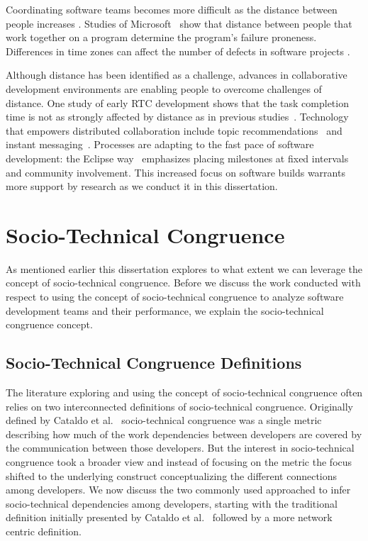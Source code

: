 Coordinating software teams becomes more difficult as the distance between people increases \cite{herbsleb:icse:2001}.
Studies of Microsoft~\cite{bird2009:dds_quality,nagappan:icse:2008}
show that distance between people that work together on a
program determine the program's failure proneness.
Differences in time zones can affect the number of defects in software projects \cite{cataldo2009:quality}.

Although distance has been identified as a challenge, advances in collaborative
development environments are enabling people to overcome challenges of distance.
One study of early RTC development
shows that the task completion time is not as strongly affected by distance as in previous studies~\cite{Nguyen:2008Distance}. Technology that empowers distributed collaboration include topic recommendations~\cite{carter2004} and instant messaging~\cite{niinimaki2008}. Processes are adapting to the fast pace of software development: the Eclipse way~\cite{frost:ieeesoftware:2007} emphasizes placing milestones at fixed intervals and community involvement.
This increased focus on software builds  warrants more support by research as we conduct it in this dissertation.




\section{Socio-Technical Congruence}
As mentioned earlier this dissertation explores to what extent we can leverage the concept of socio-technical congruence. 
Before we discuss the work conducted with respect to using the concept of socio-technical congruence to analyze software development teams and their performance, we explain the socio-technical congruence concept.

\subsection{Socio-Technical Congruence Definitions}
The literature exploring and using the concept of socio-technical congruence often relies on two interconnected definitions of socio-technical congruence.
Originally defined by Cataldo et al.~\cite{cataldo:cscw:2006} socio-technical congruence was a single metric describing how much of the work dependencies between developers are covered by the communication between those developers.
But the interest in socio-technical congruence took a broader view and instead of focusing on the metric the focus shifted to the underlying construct conceptualizing the different connections among developers.
We now discuss the two commonly used approached to infer socio-technical dependencies among developers, starting with the traditional definition initially presented by Cataldo et al.~\cite{cataldo:cscw:2006} followed by a more network centric definition.

